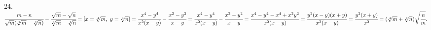 24. $\cfrac{m-n}{\sqrt{m}(\sqrt[4]{m}-\sqrt[4]{n})}-\cfrac{\sqrt{m}-\sqrt{n}}{\sqrt[4]{m}-\sqrt[4]{n}}=[x=\sqrt[4]{m},\ y=\sqrt[4]{n}]=
\cfrac{x^4-y^4}{x^2(x-y)}-\cfrac{x^2-y^2}{x-y}=\cfrac{x^4-y^4}{x^2(x-y)}-\cfrac{x^2-y^2}{x-y}=\cfrac{x^4-y^4-x^4+x^2y^2}{x^2(x-y)}=
\cfrac{y^2(x-y)(x+y)}{x^2(x-y)}=\cfrac{y^2(x+y)}{x^2}=(\sqrt[4]{m}+\sqrt[4]{n})\sqrt{\cfrac{n}{m}}.$\\
